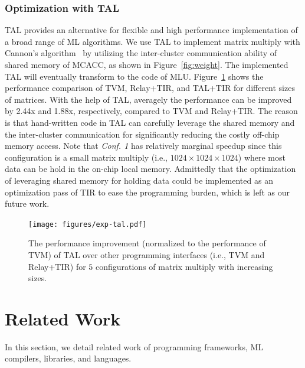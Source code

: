 \subsubsection{Optimization with TAL}
TAL provides an alternative for flexible and high performance implementation of a broad range of ML algorithms. We use TAL to implement matrix multiply with Cannon's algorithm~\cite{Lee97ICS} by utilizing the inter-cluster communication ability of shared memory of MCACC, as shown in Figure~\ref{fig:weight}. The implemented TAL will eventually transform to the code of MLU. Figure~\ref{fig:exp-tal} shows the performance comparison of TVM, Relay+TIR, and TAL+TIR for different sizes of matrices. With the help of TAL, averagely the performance can be improved by 2.44x and 1.88x, respectively, compared to TVM and Relay+TIR. The reason is that hand-written code in TAL can carefully leverage the shared memory and the inter-cluster communication for significantly reducing the costly off-chip memory access. Note that \emph{Conf. 1} has relatively marginal speedup since this configuration is a small matrix multiply (i.e., $1024 \times 1024 \times 1024$) where most data can be hold in the on-chip local memory. Admittedly that the optimization of leveraging shared memory for holding data could be implemented as an optimization pass of TIR to ease the programming burden, which is left as our future work.

\begin{figure}
\centering
\texttt{[image: figures/exp-tal.pdf]}
\vspace{-10pt}
\caption{\footnotesize The performance improvement (normalized to the performance of TVM) of TAL over other programming interfaces (i.e., TVM and Relay+TIR) for $5$ configurations of matrix multiply with increasing sizes.}
\label{fig:exp-tal}
\vspace{-15pt}
\end{figure}


\section{Related Work}

In this section, we detail related work of programming frameworks, ML compilers, libraries, and languages.


